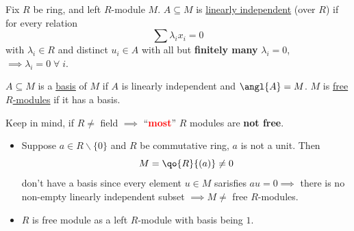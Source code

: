 \begin{definition}
	Fix \( R \) be ring, and left \( R \)-module \( M \). \( A \subseteq M \) is \underline{linearly
		independent} (over \( R \)) if for every relation
	\[
		\sum \lambda_i x_i = 0
	\]
	with \( \lambda_i \in R \) and distinct \( u_i \in A \) with all but \textbf{finitely many} \(
	\lambda_i = 0 \), \( \implies \lambda_i = 0 \; \forall \; i \).

	\( A \subseteq M \) is a \underline{basis} of \( M \) if \( A \) is linearly independent and \(
	\angl{A} = M \). \( M \) is \underline{free \( R \)-modules} if it has a basis.
\end{definition}

\begin{remark}
	Keep in mind, if \( R \ne \) field \( \implies \) ``\textbf{\textcolor{red}{most}}'' \( R \)
	modules are \textbf{not free}.
\end{remark}

\begin{eg}
	\leavevmode
	\begin{itemize}
		\item Suppose \( a\in R \backslash \{0\} \) and \( R \) be commutative ring, \( a \) is not a
		      unit. Then
		      \[
			      M = \qo{R}{(a)} \ne 0
		      \]
		      don't have a basis since every element \( u \in M \) sarisfies \( au = 0 \implies \) there is
		      no non-empty linearly independent subset \( \implies M \ne \) free \( R \)-modules.
		\item \( R \) is free module as a left \( R \)-module with basis being \( 1 \).
	\end{itemize}
\end{eg}

